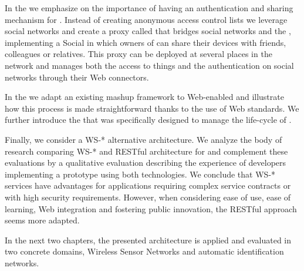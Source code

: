 In the \shareLayer{} we emphasize on the importance of having an authentication and sharing mechanism for \sts{}. Instead of creating anonymous access control lists we leverage social networks and create a proxy called \sacLong{} that bridges social networks and the \WoT{}, implementing a Social \WoTLong{} in which owners of \sts{} can share their devices with friends, colleagues or relatives. This proxy can be deployed at several places in the network and manages both the access to things and the authentication on social networks through their Web connectors.

In the \compoLayer{} we adapt an existing mashup framework to Web-enabled \sts{} and illustrate how this process is made straightforward thanks to the use of Web standards. We further introduce the \pMashupsFw{} that was specifically designed to manage the life-cycle of \pMashups{}.

Finally, we consider a WS-* alternative architecture. We analyze the body of research comparing WS-* and RESTful architecture for \sts{} and complement these evaluations by a qualitative evaluation describing the experience of developers implementing a prototype using both technologies. We conclude that WS-* services have advantages for applications requiring complex service contracts or with high security requirements. However, when considering ease of use, ease of learning, Web integration and fostering public innovation, the RESTful approach seems more adapted.

In the next two chapters, the presented architecture is applied and evaluated in two concrete domains, Wireless Sensor Networks and automatic identification networks.
